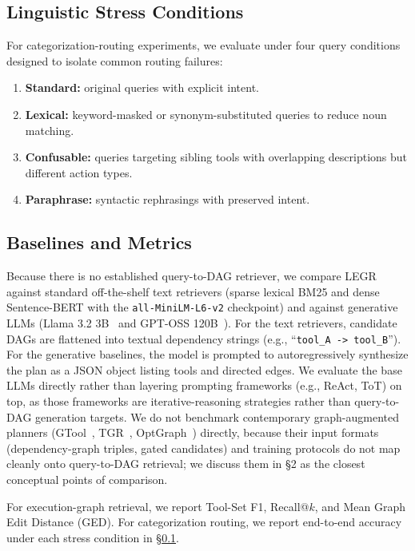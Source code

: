 \documentclass{article}
\begin{document}
\subsection{Linguistic Stress Conditions}
\label{sec:stress}
For categorization-routing experiments, we evaluate under four query conditions designed to isolate common routing failures:
\begin{enumerate}
    \item \textbf{Standard:} original queries with explicit intent.
    \item \textbf{Lexical:} keyword-masked or synonym-substituted queries to reduce noun matching.
    \item \textbf{Confusable:} queries targeting sibling tools with overlapping descriptions but different action types.
    \item \textbf{Paraphrase:} syntactic rephrasings with preserved intent.
\end{enumerate}

\subsection{Baselines and Metrics}
Because there is no established query-to-DAG retriever, we compare LEGR against standard off-the-shelf text retrievers (sparse lexical BM25 and dense Sentence-BERT with the \texttt{all-MiniLM-L6-v2} checkpoint) and against generative LLMs (Llama 3.2 3B~\cite{meta2024llama32} and GPT-OSS 120B~\cite{openai2025gptoss}). For the text retrievers, candidate DAGs are flattened into textual dependency strings (e.g., ``\texttt{tool\_A -> tool\_B}''). For the generative baselines, the model is prompted to autoregressively synthesize the plan as a JSON object listing tools and directed edges. We evaluate the base LLMs directly rather than layering prompting frameworks (e.g., ReAct, ToT) on top, as those frameworks are iterative-reasoning strategies rather than query-to-DAG generation targets. We do not benchmark contemporary graph-augmented planners (GTool~\cite{chen2026gtool}, TGR~\cite{gao2025tool}, OptGraph~\cite{xiu2026optgraph}) directly, because their input formats (dependency-graph triples, gated candidates) and training protocols do not map cleanly onto query-to-DAG retrieval; we discuss them in \S2 as the closest conceptual points of comparison.

For execution-graph retrieval, we report Tool-Set F1, Recall@$k$, and Mean Graph Edit Distance (GED). For categorization routing, we report end-to-end accuracy under each stress condition in \S\ref{sec:stress}.
\end{document}
